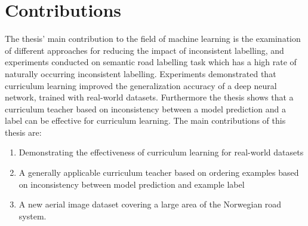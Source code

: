 \section{Contributions}
\label{sec:IntroContributions}
The thesis' main contribution to the field of machine learning  is the examination of different approaches for reducing the impact of inconsistent labelling, and experiments conducted on semantic road labelling task which has a high rate of naturally occurring inconsistent labelling. Experiments demonstrated that curriculum learning improved the generalization accuracy of a deep neural network, trained with real-world datasets. Furthermore the thesis shows that a curriculum teacher based on inconsistency between a model prediction and a label can be effective for curriculum learning. The main contributions of this thesis are:

\begin{enumerate}
\item  Demonstrating the effectiveness of curriculum learning for real-world datasets
\item  A generally applicable curriculum teacher based on ordering examples based on inconsistency between model prediction and example label
\item  A new aerial image dataset covering a large area of the Norwegian road system.
\end{enumerate}